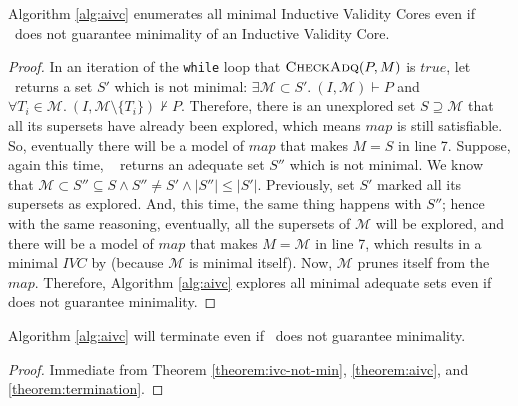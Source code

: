\begin{theorem}
\label{theorem:ivc-not-min}
  Algorithm \ref{alg:aivc} enumerates all minimal Inductive Validity Cores
  even if \getivc ~does not guarantee minimality of an Inductive Validity Core.
\end{theorem}
\begin{proof}
In an iteration of the \texttt{while} loop that $\textsc{CheckAdq} (P, M)$ is $true$,
let \getivc ~returns a set $S'$ which is not minimal:
$\exists \mathcal{M} \subset S'.~ (I, \mathcal{M}) \vdash P$ and
$\forall T_i \in \mathcal{M} . ~ (I, \mathcal{M} \setminus \{T_i\}) \nvdash P$.
Therefore, there is an unexplored set $S \supseteq \mathcal{M}$ that all its supersets have already been explored, which means
$map$ is still satisfiable.
So, eventually there will be a model of $map$ that makes $M = S$ in line 7.
Suppose, again this time, \getivc ~ returns an adequate set $S''$ which is not minimal.
We know that
  $\mathcal{M} \subset S'' \subseteq S \wedge S'' \neq S' \wedge |S''| \leq |S'|$.
  Previously, set $S'$ marked all its supersets as explored. And, this time, the
  same thing happens with $S''$; hence with the same reasoning,
  eventually, all the supersets of $\mathcal{M}$ will be explored, and there will be a model of $map$ that makes $M = \mathcal{M}$ in line 7,
  which results in a minimal $IVC$ by \getivc (because $\mathcal{M}$ is minimal itself).
  Now,  $\mathcal{M}$  prunes itself from the $map$.
  Therefore, Algorithm \ref{alg:aivc} explores all minimal adequate sets even if \getivc ~
  does not guarantee minimality.
\end{proof}

\begin{theorem}
 Algorithm \ref{alg:aivc} will terminate even if \getivc ~does not guarantee minimality.
\end{theorem}
\begin{proof}
  Immediate from Theorem \ref{theorem:ivc-not-min}, \ref{theorem:aivc}, and \ref{theorem:termination}.
\end{proof}



